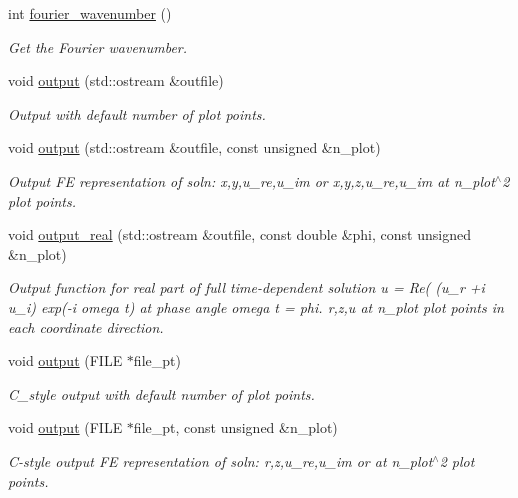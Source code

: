 \begin{DoxyCompactItemize}
int \hyperlink{classoomph_1_1FourierDecomposedHelmholtzEquations_afef1039f83ac578a7e41b4f29387e4ea}{fourier\+\_\+wavenumber} ()
\begin{DoxyCompactList}\small\item\em Get the Fourier wavenumber. \end{DoxyCompactList}\item 
void \hyperlink{classoomph_1_1FourierDecomposedHelmholtzEquations_aaa7d646147698753b363fe2f5adadeb1}{output} (std\+::ostream \&outfile)
\begin{DoxyCompactList}\small\item\em Output with default number of plot points. \end{DoxyCompactList}\item 
void \hyperlink{classoomph_1_1FourierDecomposedHelmholtzEquations_a19e2628564b587b97db37c9a4820be60}{output} (std\+::ostream \&outfile, const unsigned \&n\+\_\+plot)
\begin{DoxyCompactList}\small\item\em Output FE representation of soln\+: x,y,u\+\_\+re,u\+\_\+im or x,y,z,u\+\_\+re,u\+\_\+im at n\+\_\+plot$^\wedge$2 plot points. \end{DoxyCompactList}\item 
void \hyperlink{classoomph_1_1FourierDecomposedHelmholtzEquations_a6be7366b3597e5191ee9dbf872b7554c}{output\+\_\+real} (std\+::ostream \&outfile, const double \&phi, const unsigned \&n\+\_\+plot)
\begin{DoxyCompactList}\small\item\em Output function for real part of full time-\/dependent solution u = Re( (u\+\_\+r +i u\+\_\+i) exp(-\/i omega t) at phase angle omega t = phi. r,z,u at n\+\_\+plot plot points in each coordinate direction. \end{DoxyCompactList}\item 
void \hyperlink{classoomph_1_1FourierDecomposedHelmholtzEquations_af4d25af42bb3ccacd49e12b93bb38953}{output} (F\+I\+LE $\ast$file\+\_\+pt)
\begin{DoxyCompactList}\small\item\em C\+\_\+style output with default number of plot points. \end{DoxyCompactList}\item 
void \hyperlink{classoomph_1_1FourierDecomposedHelmholtzEquations_a1cd04195d40d3d411cda8f0323fc2e7b}{output} (F\+I\+LE $\ast$file\+\_\+pt, const unsigned \&n\+\_\+plot)
\begin{DoxyCompactList}\small\item\em C-\/style output FE representation of soln\+: r,z,u\+\_\+re,u\+\_\+im or at n\+\_\+plot$^\wedge$2 plot points. \end{DoxyCompactList}\item 

\end{DoxyCompactItemize}
